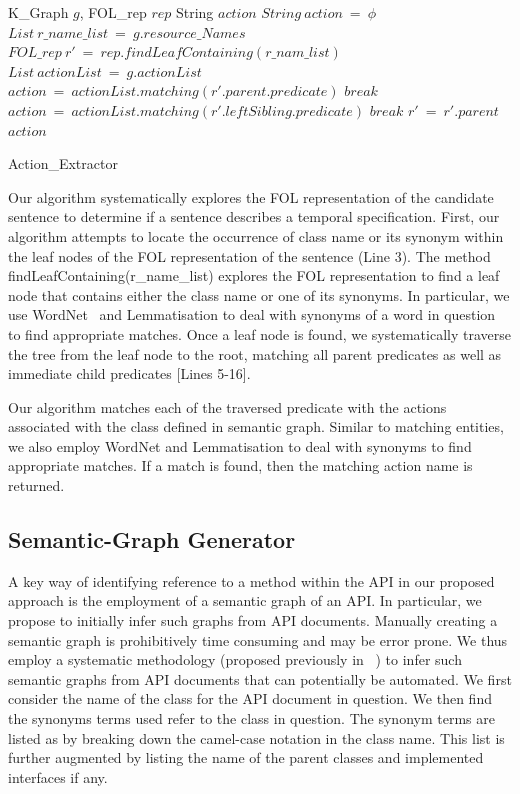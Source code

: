 \begin{algorithm}[t!]
\begin{algorithmic}[1]
\begin{scriptsize}
\REQUIRE K\_Graph $g$, FOL\_rep $rep$ 
\ENSURE String $action$
\STATE $String\ action\ =\ \phi$
\STATE $List\ r\_name\_list\ =\ g.resource\_Names$
\STATE $FOL\_rep\ r'\ =\ rep.findLeafContaining(r\_nam\_list)$
\STATE $List\ actionList\ =\ g.actionList$
		\STATE $action\ =\ actionList.matching(r'.parent.predicate)$
		\STATE $break$
	\ELSE
			\STATE $action\ =\ actionList.matching(r'.leftSibling.predicate)$
			\STATE $break$
		\ENDIF
	\ENDIF
	\STATE $r'\ =\ r'.parent$
\ENDWHILE
\RETURN $action$
\end{scriptsize}
\end{algorithmic}
\caption{Action\_Extractor}
\label{alg:SenAnnotaator}
\end{algorithm} 

Our algorithm systematically explores the FOL representation
of the candidate sentence to determine if a sentence
describes a temporal specification. First, our algorithm
attempts to locate the occurrence of class name or its synonym
within the leaf nodes of the FOL
representation of the sentence (Line 3). The method
findLeafContaining(r\_name\_list) explores the FOL representation
to find a leaf node that contains either the class name
or one of its synonyms.
In particular, we use WordNet~\cite{wordnet} and Lemmatisation
to deal with synonyms of a word in question to find appropriate
matches. Once a leaf node is found, we systematically
traverse the tree from the leaf node to the root,
matching all parent predicates as well as immediate child
predicates [Lines 5-16].

Our algorithm matches each of the traversed predicate
with the actions associated with the class defined in
semantic graph. Similar to matching entities, we also
employ WordNet and Lemmatisation to deal with
synonyms to find appropriate matches. If a match is
found, then the matching action name is returned.

\subsection{Semantic-Graph Generator}
\label{sub:ACA}

A key way of identifying reference to a method within the API in our proposed approach is the employment of a semantic graph of an API.
In particular, we propose to initially infer such graphs from API documents.
Manually creating a semantic graph is prohibitively time consuming and may be error prone.
We thus employ a systematic methodology (proposed previously in ~\cite{pandita13:WHYPER}) to infer such semantic graphs from API documents that can potentially be automated.
We first consider the name of the class for the API document in question.
We then find the synonyms terms used refer to the class in question.
The synonym terms are listed as by breaking down the camel-case notation in the class name.
This list is further augmented by listing the name of the parent classes and implemented interfaces if any. 

